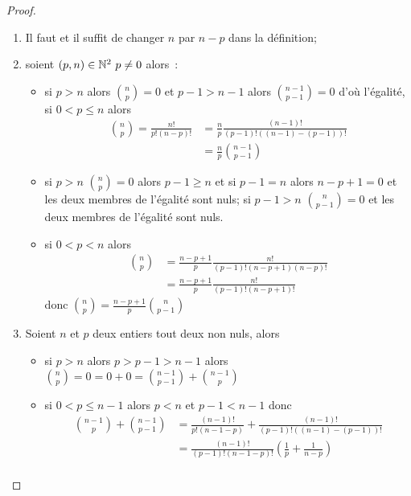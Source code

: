 \begin{proof}
  \begin{enumerate}
    \item Il faut et il suffit de changer \(n\) par \(n - p\) dans la définition;
    \item soient \((p, n)\in\mathbb{N}^2\ p\neq 0\) alors~:
      \begin{itemize}
        \item si \(p > n\) alors \(\binom{n}{p} = 0\) et \(p - 1 > n - 1\) alors 
          \(\binom{n - 1}{p - 1} = 0\) d'où l'égalité, si \(0 < p \leqslant n\) alors
        \begin{align}
          \binom{n}{p} = \frac{n!}{p!(n - p)!}
          & = \frac{n}{p}\frac{(n - 1)!}{(p - 1)!((n - 1)-(p - 1))!}\\
          & = \frac{n}{p}\binom{n - 1}{p - 1}
        \end{align}
        \item si \(p > n\) \(\binom{n}{p} = 0\) alors \(p - 1\geqslant n\) et si 
          \(p - 1 = n\) alors \(n - p + 1 = 0\) et les deux membres de l'égalité sont 
          nuls; si \(p - 1 > n\)  \(\binom{n}{p - 1} = 0\) et les deux membres de 
          l'égalité sont nuls.
        \item si \(0 < p < n\) alors
          \begin{align}
            \binom{n}{p}& = \frac{n - p + 1}{p}\frac{n!}{(p - 1)!(n - p + 1)(n - p)!}\\
                        & = \frac{n - p + 1}{p}\frac{n!}{(p - 1)!(n - p + 1)!}
          \end{align}
          donc \(\binom{n}{p} = \frac{n - p + 1}{p}\binom{n}{p - 1}\)
      \end{itemize}
    \item Soient \(n\) et \(p\) deux entiers tout deux non nuls, alors
      \begin{itemize}
        \item si \(p > n\) alors \(p > p - 1 > n - 1\) alors 
          \(\binom{n}{p} = 0 = 0 + 0 = \binom{n - 1}{p - 1} + \binom{n - 1}{p}\)
        \item si \(0 < p \leqslant n - 1\) alors \(p < n\) et \(p - 1 < n - 1\) donc
          \begin{align}
            \binom{n - 1}{p}+\binom{n - 1}{p - 1}
            &= \frac{(n - 1)!}{p!(n - 1 - p)}+\frac{(n - 1)!}{(p - 1)!((n - 1)-(p - 1))!}\\
            &= \frac{(n - 1)!}{(p - 1)!(n - 1 - p)!}\left(\frac{1}{p}+\frac{1}{n - p}\right)\\

\end{align}
\end{itemize}
\end{enumerate}
\end{proof}
